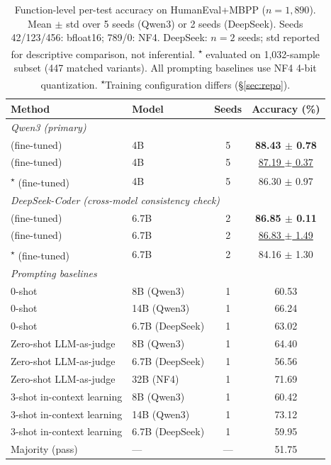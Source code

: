 \begin{table}[t]
\centering
\small
\caption{Function-level per-test accuracy on HumanEval+MBPP ($n{=}1{,}890$). Mean $\pm$ std over 5 seeds (Qwen3) or 2 seeds (DeepSeek). Seeds 42/123/456: bfloat16; 789/0: NF4. DeepSeek: $n{=}2$ seeds; std reported for descriptive comparison, not inferential. \traj{}\textsuperscript{$\star$} evaluated on 1,032-sample subset (447 matched variants). All prompting baselines use NF4 4-bit quantization. \textsuperscript{$\star$}Training configuration differs (\S\ref{sec:repo}).}
\label{tab:main_results}
\setlength{\tabcolsep}{6pt}
\renewcommand{\arraystretch}{1.0}
\begin{tabular}{llcc}
\toprule
\textbf{Method} & \textbf{Model} & \textbf{Seeds} & \textbf{Accuracy (\%)} \\
\midrule
\multicolumn{4}{l}{\emph{Qwen3 (primary)}} \\
\cls{} (fine-tuned) & 4B & 5 & \textbf{88.43 $\pm$ 0.78} \\
\cwm{} (fine-tuned) & 4B & 5 & \underline{87.19 $\pm$ 0.37} \\
\traj{}\textsuperscript{$\star$} (fine-tuned) & 4B & 5 & 86.30 $\pm$ 0.97 \\
\midrule
\multicolumn{4}{l}{\emph{DeepSeek-Coder (cross-model consistency check)}} \\
\cls{} (fine-tuned) & 6.7B & 2 & \textbf{86.85 $\pm$ 0.11} \\
\cwm{} (fine-tuned) & 6.7B & 2 & \underline{86.83 $\pm$ 1.49} \\
\traj{}\textsuperscript{$\star$} (fine-tuned) & 6.7B & 2 & 84.16 $\pm$ 1.30 \\
\midrule
\multicolumn{4}{l}{\emph{Prompting baselines}} \\
0-shot & 8B (Qwen3) & 1 & 60.53 \\
0-shot & 14B (Qwen3) & 1 & 66.24 \\
0-shot & 6.7B (DeepSeek) & 1 & 63.02 \\
Zero-shot LLM-as-judge & 8B (Qwen3) & 1 & 64.40 \\
Zero-shot LLM-as-judge & 6.7B (DeepSeek) & 1 & 56.56 \\
Zero-shot LLM-as-judge & 32B (NF4) & 1 & 71.69 \\
3-shot in-context learning & 8B (Qwen3) & 1 & 60.42 \\
3-shot in-context learning & 14B (Qwen3) & 1 & 73.12 \\
3-shot in-context learning & 6.7B (DeepSeek) & 1 & 59.95 \\
\midrule
Majority (pass) & --- & --- & 51.75 \\
\bottomrule
\end{tabular}
\end{table}


